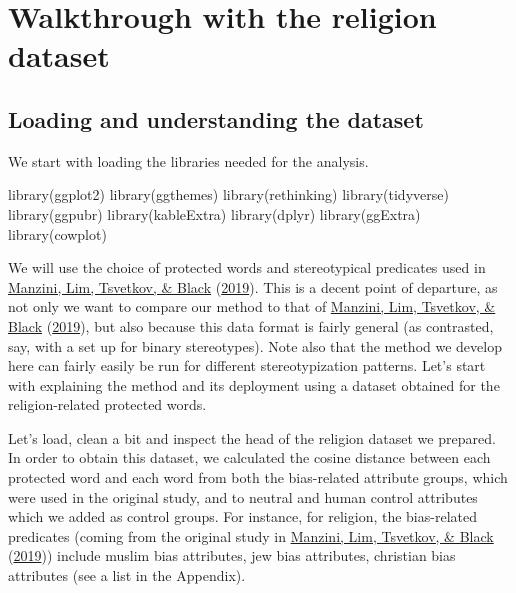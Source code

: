 \documentclass[
  12pt,
]{book}
\newenvironment{Shaded}{\begin{snugshade}}{\end{snugshade}}
\newcommand{\FunctionTok}[1]{\textcolor[rgb]{0.00,0.00,0.00}{#1}}
\newcommand{\NormalTok}[1]{#1}
\begin{document}
\hypertarget{walkthrough-with-the-religion-dataset}{%
\chapter{Walkthrough with the religion dataset}\label{walkthrough-with-the-religion-dataset}}

\hypertarget{loading-and-understanding-the-dataset}{%
\section{Loading and understanding the dataset}\label{loading-and-understanding-the-dataset}}

We start with loading the libraries needed for the analysis.

\footnotesize

\begin{Shaded}
\begin{Highlighting}[]
\FunctionTok{library}\NormalTok{(ggplot2)}
\FunctionTok{library}\NormalTok{(ggthemes)}
\FunctionTok{library}\NormalTok{(rethinking)}
\FunctionTok{library}\NormalTok{(tidyverse)}
\FunctionTok{library}\NormalTok{(ggpubr)}
\FunctionTok{library}\NormalTok{(kableExtra)}
\FunctionTok{library}\NormalTok{(dplyr)}
\FunctionTok{library}\NormalTok{(ggExtra)}
\FunctionTok{library}\NormalTok{(cowplot)}
\end{Highlighting}
\end{Shaded}

\normalsize

We will use the choice of protected words and stereotypical predicates used in \protect\hyperlink{ref-Manzini2019blackToCriminal}{Manzini, Lim, Tsvetkov, \& Black} (\protect\hyperlink{ref-Manzini2019blackToCriminal}{2019}). This is a decent point of departure, as not only we want to compare our method to that of \protect\hyperlink{ref-Manzini2019blackToCriminal}{Manzini, Lim, Tsvetkov, \& Black} (\protect\hyperlink{ref-Manzini2019blackToCriminal}{2019}), but also because this data format is fairly general (as contrasted, say, with a set up for binary stereotypes). Note also that the method we develop here can fairly easily be run for different stereotypization patterns. Let's start with explaining the method and its deployment using a dataset obtained for the religion-related protected words.

Let's load, clean a bit and inspect the head of the religion dataset we prepared. In order to obtain this dataset, we calculated the cosine distance between each protected word and each word from both the bias-related attribute groups, which were used in the original study, and to neutral and human control attributes which we added as control groups. For instance, for religion, the bias-related predicates (coming from the original study in \protect\hyperlink{ref-Manzini2019blackToCriminal}{Manzini, Lim, Tsvetkov, \& Black} (\protect\hyperlink{ref-Manzini2019blackToCriminal}{2019})) include muslim bias attributes, jew bias attributes, christian bias attributes (see a list in the Appendix).
\end{document}

